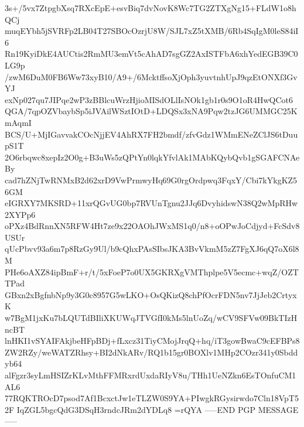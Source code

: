 3s+/5vx7ZtpgbXsq7RXcEpE+esvBiq7dvNovK8Wc7TG2ZTXgNg15+FLdW1o8hQCj
muqEYbh5jSVRFp2LB04T27SBOcOzrjU8W/SJL7xZ5tXMB/6Rb4SqIgM0leS84iI6
Rn19KyiDkE4AUCtis2RmMU3emVt5cAhAD7sgGZ2AxISTFbA6xhYedEGB39C0LG9p
/zwM6DuM0FB6Ww73xyB10/A9+/6McktffsoXjOph3yuvtnhUpJ9qzEtONXf3GvYJ
exNp027qu7JIPqe2wP3zBBlcuWrzHjioMISdOLlIsNOk1gb1r0s9O1oR4HwQCot6
QGA/7qpOZVbaybSp5iJVAilWSztIOtD+LDQSx3xNA9Pqw2tzJG6UMMGC25KmAqmI
BCS/U+MjIGavvakCOcNjjEV4AhRX7FH2bmdf/zfvGdz1WMmENeZClJS6tDuupS1T
2O6rbqwc8xepIz2O0g+B3uWs5zQPtYn0lqkYfvlAk1MAbKQybQvb1gSGAFCNAeBy
cad7hZNjTwRNMxB2d62xrD9VwPrmwyHq69G0rgOrdpwq3FqxY/Cbi7kYkgKZ56GM
eIGRXY7MKSRD+11xrQGvUG0bp7RVUnTgnu2JJq6DvyhidswN38Q2wMpRHw2XYPp6
oPXz4BdRnnXN5RFW4Ht7ze9x22OAOhJWxMS1q0/n8+oOPwJoCdjyd+FcSdv8USUr
qUcPbvv93a6m7p8RzGy9Ul/b9cQhxPAsSIbsJKA3BvVkmM5zZ7FgXJ6qQ7oX6l8M
PHe6oAXZ84ipBmF+r/t/5xFoeP7o0UX5GKRXgVMThplpe5V5ecmc+wqZ/OZTTPad
GBxn2xBgfnbNp9y3G0c8957G5wLKO+OsQKizQ8chPfOcrFDN5nv7JjJeb2CrtyxK
w7BgM1jxKu7bLQUTdBIliXKUWqJTVGfI0kMs5lnUoZq/wCV9SFVw09BkTIzHncBT
lnHKI1vSYAIFAkjbeHFpBDj+fLxcz31TiyCMojJrqQ+hq/iT3gowBwaC9cEFBPs8
ZW2RZy/weWATZRhsy+BI2dNkARv/RQ1b15gr0BOXlv1MHp2COzr341y0Sbddyb64
alFgzr3syLmHSIZrKLvMthFFMRxrdUxdaRIyV8u/THh1UeNZkn6EsTOnfuCM1AL6
77RQKTROcD7psod7Af1BcxctJw1eTLZW0S9YA+PIwgkRGysirwdo7Cln18VpT52F
IqZGL5bgcQdG3DSqH3rndcJRm2dYDLq8
=rQYA
-----END PGP MESSAGE-----
